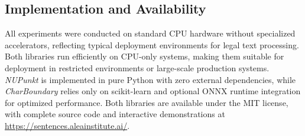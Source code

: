 \subsection{Implementation and Availability}
All experiments were conducted on standard CPU hardware without specialized accelerators, reflecting typical deployment environments for legal text processing. Both libraries run efficiently on CPU-only systems, making them suitable for deployment in restricted environments or large-scale production systems. \textit{NUPunkt} is implemented in pure Python with zero external dependencies, while \textit{CharBoundary} relies only on scikit-learn and optional ONNX runtime integration for optimized performance. Both libraries are available under the MIT license, with complete source code and interactive demonstrations at \url{https://sentences.aleainstitute.ai/}.


